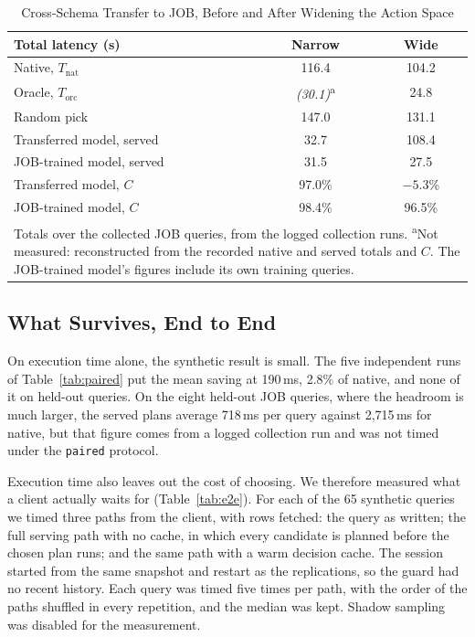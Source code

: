 \documentclass[conference]{IEEEtran}
\begin{document}
\begin{table}[t]
\caption{Cross-Schema Transfer to JOB, Before and After Widening the Action
Space}
\label{tab:transfer}
\centering
\footnotesize
\begin{tabular}{|l|c|c|}
\hline
\textbf{Total latency (s)} & \textbf{Narrow} & \textbf{Wide} \\
\hline
Native, $T_{\mathrm{nat}}$ & 116.4 & 104.2 \\
Oracle, $T_{\mathrm{orc}}$ & \textit{(30.1)}\textsuperscript{a} & 24.8 \\
Random pick & 147.0 & 131.1 \\
Transferred model, served & 32.7 & 108.4 \\
JOB-trained model, served & 31.5 & 27.5 \\
\hline
Transferred model, $C$ & 97.0\% & $-5.3$\% \\
JOB-trained model, $C$ & 98.4\% & 96.5\% \\
\hline
\multicolumn{3}{p{0.9\columnwidth}}{\scriptsize Totals over the collected JOB
queries, from the logged collection runs. \textsuperscript{a}Not measured:
reconstructed from the recorded native and served totals and $C$. The
JOB-trained model's figures include its own training queries.}
\end{tabular}
\end{table}

\subsection{What Survives, End to End}
\label{sec:survives}

On execution time alone, the synthetic result is small. The five independent
runs of Table~\ref{tab:paired} put the mean saving at 190\,ms, 2.8\% of native,
and none of it on held-out queries. On the eight held-out JOB
queries, where the headroom is much larger, the served plans average 718\,ms
per query against 2,715\,ms for native, but that figure comes from a logged collection
run and was not timed under the \texttt{paired} protocol.

Execution time also leaves out the cost of choosing. We therefore measured what
a client actually waits for (Table~\ref{tab:e2e}). For each of the 65 synthetic
queries we timed three paths from the client, with rows fetched: the query as
written; the full serving path with no cache, in which every candidate is
planned before the chosen plan runs; and the same path with a warm decision
cache. The session started from the same snapshot and restart as the
replications, so the guard had no recent history. Each query was timed five
times per path, with the order of the paths shuffled in every repetition, and
the median was kept. Shadow sampling was disabled for the measurement.
\end{document}
